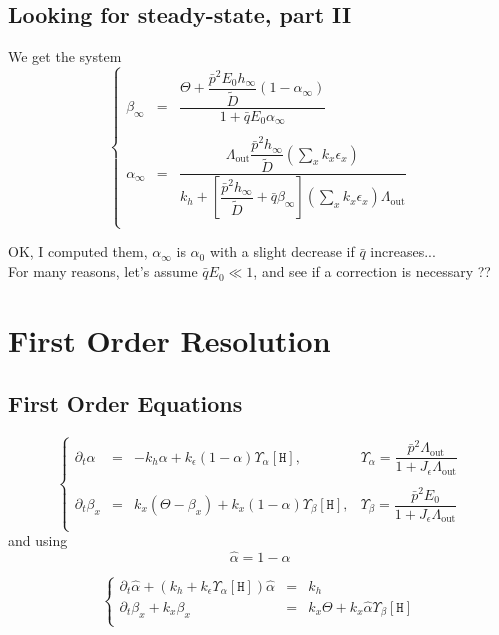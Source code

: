 \documentclass[aps,onecolumn,12pt]{revtex4}
\newcommand{\mychem}[1]{\mathtt{#1}}
\newcommand{\myconc}[1]{\left\lbrack{#1}\right\rbrack}
\newcommand{\spproton}{\mychem{H}}
\newcommand{\proton}{\myconc{\spproton}}
\newcommand{\LiAll}{\Lambda}
\newcommand{\LiAllOut}{{\LiAll}_{\mathrm{out}}}
\begin{document}
\subsection{Looking for steady-state, part II}
We get the system 
\begin{equation}
\left\lbrace
\begin{array}{rcl}
\beta_\infty & = & \dfrac{\Theta+\dfrac{\bar{p}^2 E_0 h_\infty }{\tilde{D}} \left(1-\alpha_\infty\right)}{1+\bar{q}E_0\alpha_\infty}\\
\\
\alpha_\infty & = &
 \dfrac{ \LiAllOut \dfrac{\bar{p}^2 h_\infty }{\tilde{D}} \left( \sum_x k_x \epsilon_x \right)}
 {k_h+\left[\dfrac{\bar{p}^2 h_\infty }{\tilde{D}} + \bar{q}\beta_\infty\right]\left( \sum_x k_x \epsilon_x \right)\LiAllOut}\\
\end{array}
\right.
\end{equation}

OK, I computed them, $\alpha_\infty$ is $\alpha_0$ with a slight decrease if $\bar{q}$ increases...\\
For many reasons, let's assume $\bar{q}E_0\ll 1$, and see if a correction is necessary ??

\section{First Order Resolution}
\subsection{First Order Equations}
\begin{equation}
\left\lbrace
\begin{array}{rcll}
\partial_t \alpha & = & -k_h \alpha +
	  k_\epsilon (1-\alpha) \Upsilon_\alpha \proton , & \Upsilon_\alpha= \dfrac{\bar{p}^2\LiAllOut}{1+J_\epsilon \LiAllOut}\\
	 \\
\partial_t \beta_x & = & k_x\left(\Theta - \beta_x \right) + k_x (1-\alpha) \Upsilon_\beta \proton, & \Upsilon_\beta = \dfrac{\bar{p}^2E_0}{1+J_\epsilon \LiAllOut}\\
\end{array}
\right.
\end{equation}
and using
\begin{equation}
	\hat\alpha = 1-\alpha
\end{equation}

\begin{equation}
\left\lbrace
\begin{array}{rcl}
	\partial_t \hat\alpha + \left(k_h+k_\epsilon \Upsilon_\alpha \proton \right) \hat\alpha & = & k_h\\
	\partial_t \beta_x  + k_x \beta_x  & = & k_x \Theta + k_x \hat\alpha \Upsilon_\beta \proton \\
\end{array}
\right.
\end{equation}
\end{document}
